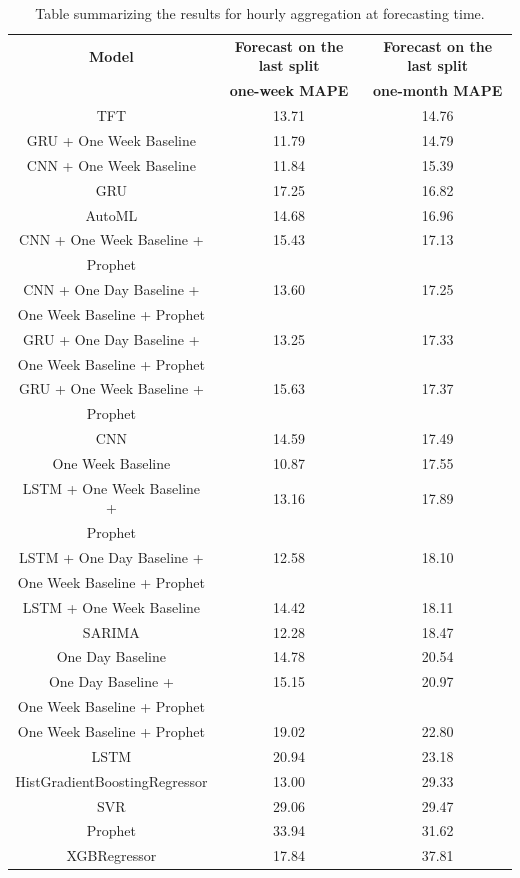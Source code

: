 \begin{table}[H]
\centering
\begin{tabular}{|c|c|c|}
\hline
\textbf{Model} & \textbf{Forecast on the last split} & \textbf{Forecast on the last split}\\
 & \textbf{one-week MAPE} & \textbf{one-month MAPE}\\
\hline
TFT & 13.71 & 14.76\\
\hline
GRU + One Week Baseline & 11.79 & 14.79\\
\hline
CNN + One Week Baseline & 11.84 & 15.39\\
\hline
GRU & 17.25 & 16.82\\
\hline
AutoML & 14.68 & 16.96\\
\hline
CNN + One Week Baseline + & 15.43 & 17.13\\
Prophet & & \\
\hline
CNN + One Day Baseline + & 13.60 & 17.25\\
One Week Baseline + Prophet & & \\
\hline
GRU + One Day Baseline + & 13.25 & 17.33\\
One Week Baseline + Prophet & & \\
\hline
GRU + One Week Baseline + & 15.63 & 17.37\\
Prophet & & \\
\hline
CNN & 14.59 & 17.49\\
\hline
One Week Baseline & 10.87 & 17.55\\
\hline
LSTM + One Week Baseline + & 13.16 & 17.89\\
Prophet & & \\
\hline
LSTM + One Day Baseline + & 12.58 & 18.10\\
One Week Baseline + Prophet & & \\
\hline
LSTM + One Week Baseline & 14.42 & 18.11\\
\hline
SARIMA & 12.28 & 18.47\\
\hline
One Day Baseline & 14.78 & 20.54\\
\hline
One Day Baseline + & 15.15 & 20.97\\
One Week Baseline + Prophet & & \\
\hline
One Week Baseline + Prophet & 19.02 & 22.80\\
\hline
LSTM & 20.94 & 23.18\\
\hline
HistGradientBoostingRegressor & 13.00 & 29.33\\
\hline
SVR & 29.06 & 29.47\\
\hline
Prophet & 33.94 & 31.62\\
\hline
XGBRegressor & 17.84 & 37.81\\
\hline
\end{tabular}
\caption{Table summarizing the results for hourly aggregation at forecasting time.}
\label{tab:demandhourlyresultsforecast}
\end{table}

